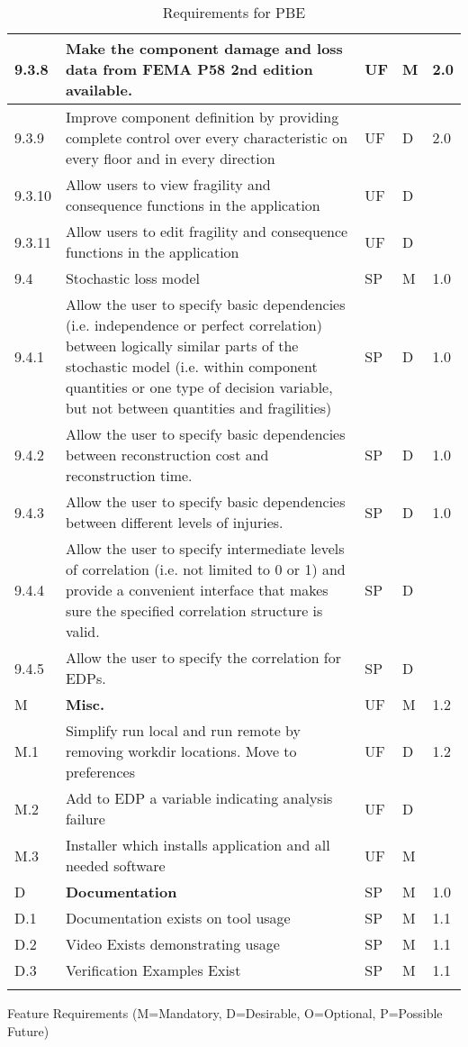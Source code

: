 \begin{longtable}{| p{} | p{} | p{} | p{} |  p{} |}
9.3.8 & Make the component damage and loss data from FEMA P58 2nd edition available. & UF & M & 2.0 \\ \hline
9.3.9 & Improve component definition by providing complete control over every characteristic on every floor and in every direction & UF & D & 2.0 \\ \hline
9.3.10 & Allow users to view fragility and consequence functions in the application & UF & D &  \\ \hline
9.3.11 & Allow users to edit fragility and consequence functions in the application & UF & D &  \\ \hline
9.4 & Stochastic loss model & SP & M & 1.0 \\ \hline
9.4.1 & Allow the user to specify basic dependencies (i.e. independence or perfect correlation) between logically similar parts of the stochastic model (i.e. within component quantities or one type of decision variable, but not between quantities and fragilities) & SP & D & 1.0 \\ \hline
9.4.2 & Allow the user to specify basic dependencies between reconstruction cost and reconstruction time. & SP & D & 1.0 \\ \hline
9.4.3 & Allow the user to specify basic dependencies between different levels of injuries. & SP & D & 1.0 \\ \hline
9.4.4 & Allow the user to specify intermediate levels of correlation (i.e. not limited to 0 or 1) and provide a convenient interface that makes sure the specified correlation structure is valid. & SP & D & \\ \hline   
9.4.5 & Allow the user to specify the correlation for EDPs. & SP & D &  \\ \hline  

 M & \textbf{Misc.} & UF & M & 1.2  \\ \hline
   M.1 & Simplify run local and run remote by removing workdir locations. Move to preferences & UF & D & 1.2  \\ \hline
   M.2 & Add to EDP a variable indicating analysis failure & UF & D &   \\ \hline
   M.3 & Installer which installs application and all needed software & UF & M &   \\ \hline
 D & \textbf{Documentation} &  SP & M & 1.0 \\ \hline
 D.1 & Documentation exists on tool usage & SP & M & 1.1  \\ \hline
 D.2 & Video Exists demonstrating usage & SP & M & 1.1  \\ \hline
 D.3 & Verification Examples Exist & SP & M & 1.1  \\ \hline
  \bottomrule 
\caption{Requirements for PBE}
  \label{tab:featureRequirements}                 
\end{longtable}

Feature Requirements (M=Mandatory, D=Desirable, O=Optional, P=Possible Future)